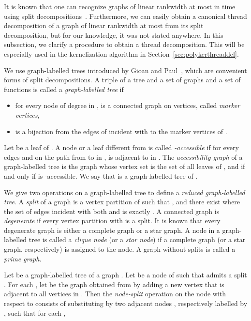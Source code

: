 \documentclass[11pt]{article}
\theoremstyle{remark}
\begin{document}
It is known that one can recognize graphs of linear rankwidth at most  in time  using split decompositions~\cite{Bui-XuanKL13, AdlerKK20152}.
Furthermore, we can easily obtain a canonical thread decomposition of a graph of linear rankwidth at most  from its split decomposition, 
but for our knowledge, it was not stated anywhere.
In this subsection, we clarify a procedure to obtain a thread decomposition.
This will be especially used in the kernelization algorithm in Section~\ref{sec:polykerthreaddel}.








We use graph-labelled trees introduced by Gioan and Paul~\cite{GP2012}, which are convenient forms of split decompositions.  
A triple  of a tree  and a set of graphs  and a set of functions  is called a \emph{graph-labelled tree} if 
\begin{itemize}
\item for every node  of degree  in ,  is a connected graph on  vertices, called \emph{marker vertices},
\item  is a bijection from the edges of  incident with  to the marker vertices of . 
\end{itemize}
Let  be a leaf of .
A node or a leaf  different from  is called \emph{-accessible} if for every edges  and  on the path from  to  in ,
 is adjacent to  in . 
The \emph{accessibility graph} of a graph-labelled tree  is the graph  whose vertex set is the set of all leaves of , 
and  if and only if  is -accessible. We say that  is a graph-labelled tree of .


We give two operations on a graph-labelled tree to define a \emph{reduced graph-labelled tree}.
A \emph{split} of a graph  is a vertex partition  of  such that
, and there exist  where the set of edges incident with both  and  is exactly .
 A connected graph is \emph{degenerate} if every vertex partition  with  is a split.
It is known that every degenerate graph is either a complete graph or a star graph.
 A node in a graph-labelled tree is called a \emph{clique node} (or a \emph{star node}) if a complete graph (or a star graph, respectively) is assigned to the node.
 A graph without splits is called a \emph{prime graph}.
 
Let  be a graph-labelled tree of a graph .
Let  be a node of  such that  admits a split .
For each , 
let  be the graph obtained from  by adding a new vertex  that is adjacent to all vertices in .
Then the \emph{node-split} operation on the node  with respect to 
consists of substituting  by two adjacent nodes , respectively labelled by , such that for each , 
\end{document}
